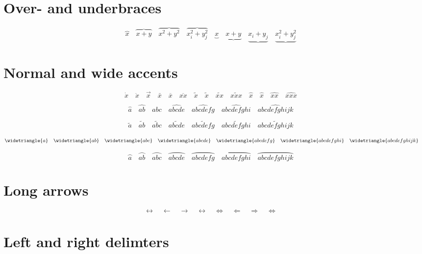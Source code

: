 \documentclass[fleqn]{article}
\begin{document}
\section*{Over- and underbraces}

\begin{displaymath}
  \overbrace{x} \quad
  \overbrace{x+y} \quad
  \overbrace{x^{2}+y^{2}} \quad
  \overbrace{x_{i}^{2}+y_{j}^{2}} \quad
  \underbrace{x} \quad
  \underbrace{x+y} \quad
  \underbrace{x_{i}+y_{j}} \quad
  \underbrace{x_{i}^{2}+y_{j}^{2}} \quad
\end{displaymath}


\section*{Normal and wide accents}

\begin{displaymath}
  \dot{x} \quad
  \ddot{x} \quad
  \vec{x} \quad
  \bar{x} \quad
  \overline{x} \quad
  \overline{xx} \quad
  \tilde{x} \quad
  \widetilde{x} \quad
  \widetilde{xx} \quad
  \widetilde{xxx} \quad
  \hat{x} \quad
  \widehat{x} \quad
  \widehat{xx} \quad
  \widehat{xxx} \quad
\end{displaymath}

\def\testwilde#1{
    \begin{displaymath}
        #1{a} \quad
        #1{ab} \quad 
        #1{abc} \quad 
        #1{abcde} \quad 
        #1{abcdefg} \quad 
        #1{abcdefghi} \quad 
        #1{abcdefghijk} \quad 
    \end{displaymath}}

\testwilde\widehat
\testwilde\widetilde
\testwilde\widetriangle
\testwilde\wideparen


\section*{Long arrows}

\begin{displaymath}
    \leftrightarrow \quad
  \longleftarrow  \quad
  \longrightarrow \quad
  \longleftrightarrow \quad
  \Leftrightarrow \quad
  \Longleftarrow  \quad
  \Longrightarrow \quad
  \Longleftrightarrow \quad
\end{displaymath}


\section*{Left and right delimters}
\end{document}
